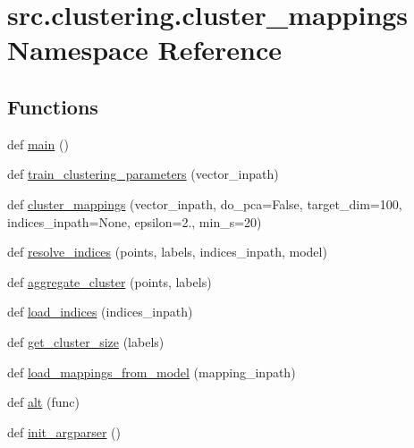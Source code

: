 \hypertarget{namespacesrc_1_1clustering_1_1cluster__mappings}{}\section{src.\+clustering.\+cluster\+\_\+mappings Namespace Reference}
\label{namespacesrc_1_1clustering_1_1cluster__mappings}
\subsection*{Functions}
\begin{DoxyCompactItemize}
\item 
def \hyperlink{namespacesrc_1_1clustering_1_1cluster__mappings_a88fac149a2f50ab788d49641e40eff26}{main} ()
\item 
def \hyperlink{namespacesrc_1_1clustering_1_1cluster__mappings_abe09f35ebed7355349cb8e4d4449d352}{train\+\_\+clustering\+\_\+parameters} (vector\+\_\+inpath)
\item 
def \hyperlink{namespacesrc_1_1clustering_1_1cluster__mappings_a20f212f41bf9a610ec0b8582054f0eae}{cluster\+\_\+mappings} (vector\+\_\+inpath, do\+\_\+pca=False, target\+\_\+dim=100, indices\+\_\+inpath=None, epsilon=2., min\+\_\+s=20)
\item 
def \hyperlink{namespacesrc_1_1clustering_1_1cluster__mappings_aea338d4bf7a937a56ef575d1675c28d7}{resolve\+\_\+indices} (points, labels, indices\+\_\+inpath, model)
\item 
def \hyperlink{namespacesrc_1_1clustering_1_1cluster__mappings_accdc0539121b7bd8d2368cccbfeef4a3}{aggregate\+\_\+cluster} (points, labels)
\item 
def \hyperlink{namespacesrc_1_1clustering_1_1cluster__mappings_a58faafde39604ae8247b4946f8292541}{load\+\_\+indices} (indices\+\_\+inpath)
\item 
def \hyperlink{namespacesrc_1_1clustering_1_1cluster__mappings_afc033e44dfb5c6953c53314f6f86e22e}{get\+\_\+cluster\+\_\+size} (labels)
\item 
def \hyperlink{namespacesrc_1_1clustering_1_1cluster__mappings_a59e6668560bdac9085a9d6ab364a9d0d}{load\+\_\+mappings\+\_\+from\+\_\+model} (mapping\+\_\+inpath)
\item 
def \hyperlink{namespacesrc_1_1clustering_1_1cluster__mappings_a69ce1b3be3ed909458b8f9dfe90d7585}{alt} (func)
\item 
def \hyperlink{namespacesrc_1_1clustering_1_1cluster__mappings_ae22fbf49e267ac9c9640c33c0ee4f1f1}{init\+\_\+argparser} ()
\end{DoxyCompactItemize}


